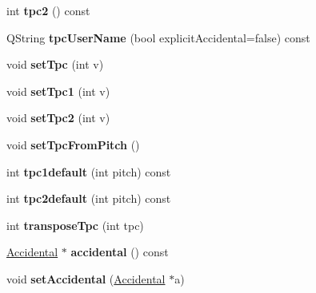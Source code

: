 \begin{DoxyCompactItemize}
\mbox{\label{class_ms_1_1_note_ab9c2a85410e0eda228b182a1a455bfe9}} 
int {\bfseries tpc2} () const
\item 
\mbox{\label{class_ms_1_1_note_ac9e13d0d98a6a9acaa0186483ca93b3b}} 
Q\+String {\bfseries tpc\+User\+Name} (bool explicit\+Accidental=false) const
\item 
\mbox{\label{class_ms_1_1_note_a8fd1eb2a642f8fef03f86210a4978ee7}} 
void {\bfseries set\+Tpc} (int v)
\item 
\mbox{\label{class_ms_1_1_note_a7b1cb6772bc40d4e6c6d005a8a514f77}} 
void {\bfseries set\+Tpc1} (int v)
\item 
\mbox{\label{class_ms_1_1_note_a6be8a4d3de7151fa3c6ee5420bc15731}} 
void {\bfseries set\+Tpc2} (int v)
\item 
\mbox{\label{class_ms_1_1_note_ada8ff30ba7ff1ba04e00fb2f8b971048}} 
void {\bfseries set\+Tpc\+From\+Pitch} ()
\item 
\mbox{\label{class_ms_1_1_note_a40ede174072aaa879eb707e6c014550b}} 
int {\bfseries tpc1default} (int pitch) const
\item 
\mbox{\label{class_ms_1_1_note_ab8c8466304bdd7179ac41f03784332c9}} 
int {\bfseries tpc2default} (int pitch) const
\item 
\mbox{\label{class_ms_1_1_note_a5546123c8824914f864f02ae364d7bdd}} 
int {\bfseries transpose\+Tpc} (int tpc)
\item 
\mbox{\label{class_ms_1_1_note_a39025226e9614de8073a91e82dcbb8ee}} 
\hyperlink{class_ms_1_1_accidental}{Accidental} $\ast$ {\bfseries accidental} () const
\item 
\mbox{\label{class_ms_1_1_note_a94a1df4d90e182eeb81cc704f32b6eb6}} 
void {\bfseries set\+Accidental} (\hyperlink{class_ms_1_1_accidental}{Accidental} $\ast$a)
\item 
\mbox{\label{class_ms_1_1_note_a7edd98335208a0995062f183ccdf27a1}} 

\end{DoxyCompactItemize}
